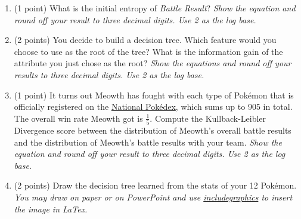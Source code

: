 \documentclass[11pt]{article}
\begin{document}
\begin{enumerate}[(1)]
\item (1 point) What is the initial entropy of \textit{Battle Result}? \textit{Show the equation and round off your result to three decimal digits. Use 2 as the log base.}\\
\begin{answertext}{7cm}{}

\end{answertext}
\newpage
\item (2 points)  You decide to build a decision tree. Which feature would you choose to use as the root of the tree?  What is the information gain of the attribute you just chose as the root? \textit{Show the equations and round off your results to three decimal digits. Use 2 as the log base.}\\
\begin{answertext}{10cm}{}

\end{answertext}

\item (1 point) It turns out Meowth has fought with each type of Pok\'emon that is officially registered on the \href{https://www.pokemon.com/us/pokedex/}{National Pok\'edex}, which sums up to 905 in total. The overall win rate Meowth got is $\frac{1}{5}$. Compute the Kullback-Leibler Divergence score between the distribution of Meowth's overall battle results and the distribution of Meowth's battle results with your team. \textit{Show the equation and round off your result to three decimal digits. Use 2 as the log base.}\\

\begin{answertext}{6cm}{}


\end{answertext}
\newpage
\item (2 points) Draw the decision tree learned from the stats of your 12 Pok\'emon. \textit{You may draw on paper or on PowerPoint and use \href{https://www.overleaf.com/learn/latex/Inserting_Images}{includegraphics} to insert the image in LaTex.}\\

\begin{answertext}{21cm}{}

\end{answertext}



\end{enumerate}
\end{document}

